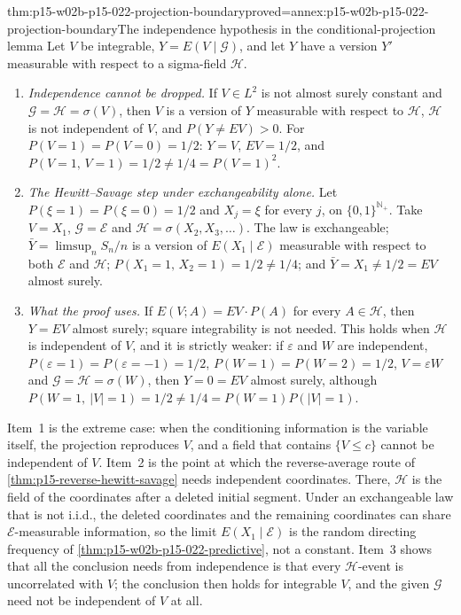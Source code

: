 \begin{hbtheorem}{thm:p15-w02b-p15-022-projection-boundary}{proved=annex:p15-w02b-p15-022-projection-boundary}{The independence hypothesis in the conditional-projection lemma}
Let \(V\) be integrable, \(Y=E(V\mid\mathcal G)\), and let \(Y\) have a
version \(Y'\) measurable with respect to a sigma-field \(\mathcal H\).
\begin{enumerate}
\item \emph{Independence cannot be dropped.} If \(V\in L^2\) is not almost
      surely constant and \(\mathcal G=\mathcal H=\sigma(V)\), then \(V\) is
      a version of \(Y\) measurable with respect to \(\mathcal H\),
      \(\mathcal H\) is not independent of \(V\), and
      \(P(Y\neq EV)>0\). For \(P(V=1)=P(V=0)=1/2\):
      \(Y=V\), \(EV=1/2\), and
      \(P(V=1,\,V=1)=1/2\neq1/4=P(V=1)^2\).
\item \emph{The Hewitt--Savage step under exchangeability alone.} Let
      \(P(\xi=1)=P(\xi=0)=1/2\) and \(X_j=\xi\) for every \(j\), on
      \(\{0,1\}^{\mathbb N_+}\). Take \(V=X_1\), \(\mathcal G=\mathcal E\)
      and \(\mathcal H=\sigma(X_2,X_3,\ldots)\). The law is exchangeable;
      \(\bar Y=\limsup_nS_n/n\) is a version of \(E(X_1\mid\mathcal E)\)
      measurable with respect to both \(\mathcal E\) and \(\mathcal H\);
      \(P(X_1=1,\,X_2=1)=1/2\neq1/4\); and \(\bar Y=X_1\neq1/2=EV\) almost
      surely.
\item \emph{What the proof uses.} If
      \(E(V;A)=EV\cdot P(A)\) for every \(A\in\mathcal H\), then
      \(Y=EV\) almost surely; square integrability is not needed. This
      holds when \(\mathcal H\) is independent of \(V\), and it is strictly
      weaker: if \(\varepsilon\) and \(W\) are independent,
      \(P(\varepsilon=1)=P(\varepsilon=-1)=1/2\),
      \(P(W=1)=P(W=2)=1/2\), \(V=\varepsilon W\) and
      \(\mathcal G=\mathcal H=\sigma(W)\), then \(Y=0=EV\) almost surely,
      although \(P(W=1,\ |V|=1)=1/2\neq1/4=P(W=1)P(|V|=1)\).
\end{enumerate}
\end{hbtheorem}

Item~1 is the extreme case: when the conditioning information is the
variable itself, the projection reproduces \(V\), and a field that contains
\(\{V\leq c\}\) cannot be independent of \(V\). Item~2 is the point at which
the reverse-average route of \cref{thm:p15-reverse-hewitt-savage} needs
independent coordinates. There, \(\mathcal H\) is the field of the
coordinates after a deleted initial segment. Under an exchangeable law that is not
i.i.d., the deleted coordinates and the remaining coordinates can share
\(\mathcal E\)-measurable information, so the limit
\(E(X_1\mid\mathcal E)\) is the random directing frequency of
\cref{thm:p15-w02b-p15-022-predictive}, not a constant. Item~3 shows that
all the conclusion needs from independence is that every
\(\mathcal H\)-event is uncorrelated with \(V\); the conclusion then
holds for integrable \(V\), and the given \(\mathcal G\) need not be
independent of \(V\) at all.

